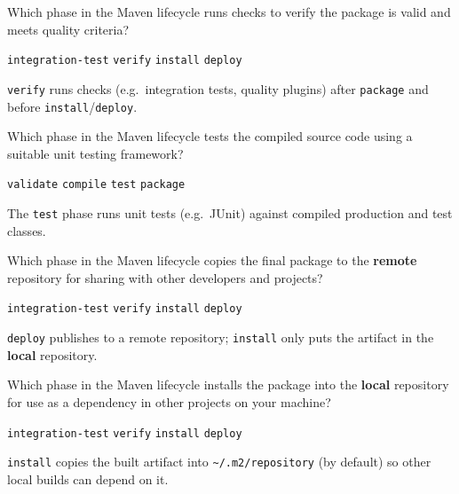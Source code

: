 \question[4]
Which phase in the Maven lifecycle runs checks to verify the package is valid and meets quality criteria?
\begin{choices}
  \choice \texttt{integration-test}
  \CorrectChoice \texttt{verify}
  \choice \texttt{install}
  \choice \texttt{deploy}
\end{choices}
\begin{solution}
  \texttt{verify} runs checks (e.g.\ integration tests, quality plugins) after \texttt{package} and before \texttt{install}/\texttt{deploy}.
\end{solution}

\question[4]
Which phase in the Maven lifecycle tests the compiled source code using a suitable unit testing framework?
\begin{choices}
  \choice \texttt{validate}
  \choice \texttt{compile}
  \CorrectChoice \texttt{test}
  \choice \texttt{package}
\end{choices}
\begin{solution}
  The \texttt{test} phase runs unit tests (e.g.\ JUnit) against compiled production and test classes.
\end{solution}

\question[4]
Which phase in the Maven lifecycle copies the final package to the \textbf{remote} repository for sharing with other developers and projects?
\begin{choices}
  \choice \texttt{integration-test}
  \choice \texttt{verify}
  \choice \texttt{install}
  \CorrectChoice \texttt{deploy}
\end{choices}
\begin{solution}
  \texttt{deploy} publishes to a remote repository; \texttt{install} only puts the artifact in the \textbf{local} repository.
\end{solution}

\question[4]
Which phase in the Maven lifecycle installs the package into the \textbf{local} repository for use as a dependency in other projects on your machine?
\begin{choices}
  \choice \texttt{integration-test}
  \choice \texttt{verify}
  \CorrectChoice \texttt{install}
  \choice \texttt{deploy}
\end{choices}
\begin{solution}
  \texttt{install} copies the built artifact into \texttt{\textasciitilde/.m2/repository} (by default) so other local builds can depend on it.
\end{solution}


